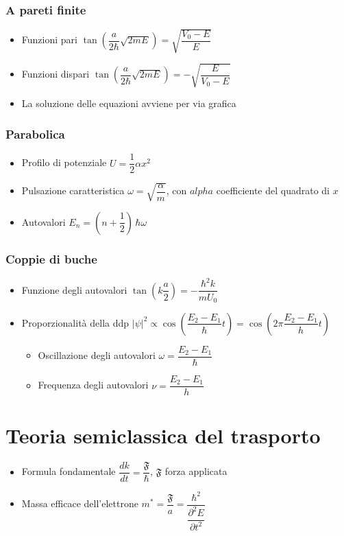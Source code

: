 \documentclass{article}
\begin{document}
\subsubsection{A pareti finite}
\begin{itemize}
  \item Funzioni pari \( \tan\left( \dfrac{a}{2 \hbar} \sqrt{2mE} \right) = \sqrt{\dfrac{V_0 - E}{E}} \)
  \item Funzioni dispari \( \tan\left( \dfrac{a}{2 \hbar} \sqrt{2mE} \right) = - \sqrt{\dfrac{E}{V_0 - E}} \)
  \item La soluzione delle equazioni avviene per via grafica
\end{itemize}

\subsubsection{Parabolica}
\begin{itemize}
  \item Profilo di potenziale \( U = \dfrac{1}{2} \alpha x ^ 2 \)
  \item Pulsazione caratteristica \( \omega = \sqrt{\dfrac{\alpha}{m}} \), con \( alpha \) coefficiente del quadrato di \( x \)
  \item Autovalori \( E_n = ( n + \dfrac{1}{2} ) \, \hbar \omega \)
\end{itemize}

\subsubsection{Coppie di buche}
\begin{itemize}
  \item Funzione degli autovalori \( \tan\left( k \dfrac{a}{2} \right) = - \dfrac{\hbar ^2 k}{m U_0} \)
  \item Proporzionalità della ddp \( \left| \psi \right| ^ 2 \propto \cos \left( \dfrac{E_2 - E_1}{\hbar} t \right) = \cos \left( 2 \pi \dfrac{E_2 - E_1}{h} t \right)  \)
        \begin{itemize}
          \item Oscillazione degli autovalori \( \omega = \dfrac{E_2 - E_1}{\hbar} \)
          \item Frequenza degli autovalori \( \nu = \dfrac{E_2 - E_1}{h} \)
        \end{itemize}
\end{itemize}

\section{Teoria semiclassica del trasporto}
\begin{itemize}
  \item Formula fondamentale \( \dfrac{dk}{dt} = \dfrac{\mathfrak{F} }{\hbar} \), \( \mathfrak{F}  \) forza applicata
  \item Massa efficace dell'elettrone \( m ^ \ast = \dfrac{ \mathfrak{F} }{a} = \dfrac{\hbar ^ 2}{\dfrac{\partial ^ 2 E}{\partial t ^ 2}} \)
\end{itemize}
\end{document}
